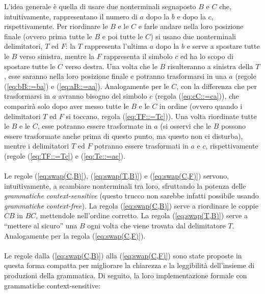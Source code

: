     L'idea generale è quella di usare due nonterminali segnaposto $B$ e $C$ che, intuitivamente, rappresentano il numero di $a$ dopo la $b$ e dopo la $c$, rispettivamente. Per riordinare le $B$ e le $C$ e farle andare nella loro posizione finale (ovvero prima tutte le $B$ e poi tutte le $C$) si usano due nonterminali delimitatori, $T$ ed $F$: la $T$ rappresenta l'ultima $a$ dopo la $b$ e serve a spostare tutte le $B$ verso sinistra, mentre la $F$ rappresenta il simbolo $c$ ed ha lo scopo di spostare tutte le $C$ verso destra. Una volta che le $B$ risulteranno a sinistra della $T$, esse saranno nella loro posizione finale e potranno trasformarsi in una $a$ (regole (\ref{eq:bB::=ba}) e (\ref{eq:aB::=aa}). Analogamente per le $C$, con la differenza che per trasformarsi in $a$ avranno bisogno del simbolo $c$ (regola (\ref{eq:cC::=ca})), che comparirà solo dopo aver messo tutte le $B$ e le $C$ in ordine (ovvero quando i delimitatori $T$ ed $F$ si toccano, regola (\ref{eq:TF::=Tc})). Una volta riordinate tutte le $B$ e le $C$, esse potranno essere trasformate in $a$ (si osservi che le $B$ possono essere trasformate anche prima di questo punto, ma questo non ci disturba), mentre i delimitatori $T$ ed $F$ potranno essere trasformati in $a$ e $c$, rispettivamente (regole (\ref{eq:TF::=Tc}) e (\ref{eq:Tc::=ac}).\\
    \\
    Le regole (\ref{eq:swap(C,B)}), (\ref{eq:swap(T,B)}) e (\ref{eq:swap(C,F)}) servono, intuitivamente, a scambiare nonterminali tra loro, sfruttando la potenza delle \textit{grammatiche context-sensitive} (questo trucco non sarebbe infatti possibile usando \textit{grammatiche context-free}). La regola (\ref{eq:swap(C,B)}) serve a riordinare le coppie $CB$ in $BC$, mettendole nell'ordine corretto. La regola (\ref{eq:swap(T,B)}) serve a ``mettere al sicuro'' una $B$ ogni volta che viene trovata dal delimitatore $T$. Analogamente per la regola (\ref{eq:swap(C,F)}).\\
    \\
    Le regole dalla (\ref{eq:swap(C,B)}) alla (\ref{eq:swap(C,F)}) sono state proposte in questa forma compatta per migliorare la chiarezza e la leggibilità dell'insieme di produzioni della grammatica. Di seguito, la loro implementazione formale con grammatiche context-sensitive:
    
